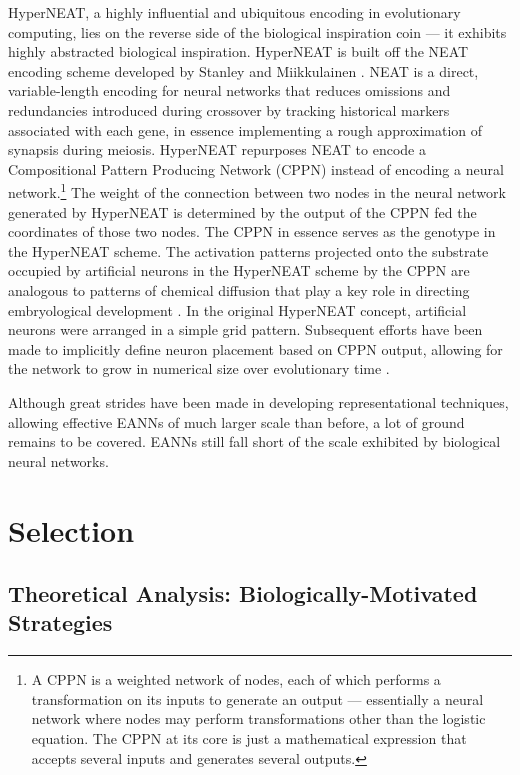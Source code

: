 HyperNEAT, a highly influential and ubiquitous encoding in evolutionary computing, lies on the reverse side of the biological inspiration coin --- it exhibits highly abstracted biological inspiration.
HyperNEAT is built off the NEAT encoding scheme developed by Stanley and Miikkulainen \cite[p 324]{Downing2015IntelligenceSystems}.
NEAT is a direct, variable-length encoding for neural networks that reduces omissions and redundancies introduced during crossover by tracking historical markers associated with each gene, in essence implementing a rough approximation of synapsis during meiosis.
HyperNEAT repurposes NEAT to encode a Compositional Pattern Producing Network (CPPN) instead of encoding a neural network.\footnote{
A CPPN is a weighted network of nodes, each of which performs a transformation on its inputs to generate an output --- essentially a neural network where nodes may perform transformations other than the logistic equation. The CPPN at its core is just a mathematical expression that accepts several inputs and generates several outputs.}
The weight of the connection between two nodes in the neural network generated by HyperNEAT is determined by the output of the CPPN fed the coordinates of those two nodes.
The CPPN in essence serves as the genotype in the HyperNEAT scheme.
The activation patterns projected onto the substrate occupied by artificial neurons in the HyperNEAT scheme by the CPPN are analogous to patterns of chemical diffusion that play a key role in directing embryological development \cite[p 339]{Downing2015IntelligenceSystems}.
In the original HyperNEAT concept, artificial neurons were arranged in a simple grid pattern.
Subsequent efforts have been made to implicitly define neuron placement based on CPPN output, allowing for the network to grow in numerical size over evolutionary time \cite{Risi2010EvolvingSubstrate,Risi2010IndirectlyRules}.

Although great strides have been made in developing representational techniques, allowing effective EANNs of much larger scale than before, a lot of ground remains to be covered.
EANNs still fall short of the scale exhibited by biological neural networks.

\section{Selection} \label{sec:selection}

\subsection{Theoretical Analysis: Biologically-Motivated Strategies}

